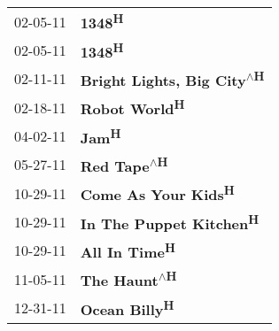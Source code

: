 \begin{supertabular}{p{0.25\columnwidth}p{0.75\columnwidth}}
 02-05-11 &                             \textbf{1348\textsuperscript{H}} \\
 02-05-11 &                             \textbf{1348\textsuperscript{H}} \\
 02-11-11 &  \textbf{Bright Lights, Big City\textsuperscript{$\wedge$H}} \\
 02-18-11 &                      \textbf{Robot World\textsuperscript{H}} \\
 04-02-11 &                              \textbf{Jam\textsuperscript{H}} \\
 05-27-11 &                 \textbf{Red Tape\textsuperscript{$\wedge$H}} \\
 10-29-11 &                \textbf{Come As Your Kids\textsuperscript{H}} \\
 10-29-11 &            \textbf{In The Puppet Kitchen\textsuperscript{H}} \\
 10-29-11 &                      \textbf{All In Time\textsuperscript{H}} \\
 11-05-11 &                \textbf{The Haunt\textsuperscript{$\wedge$H}} \\
 12-31-11 &                      \textbf{Ocean Billy\textsuperscript{H}} \\
\end{supertabular}
